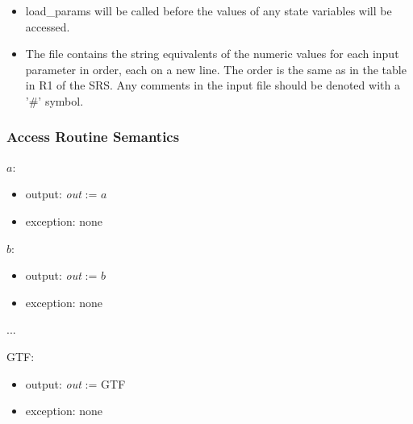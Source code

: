 \documentclass[12pt, titlepage]{article}
\begin{document}
\begin{itemize}

\item load\_params will be called before the values of any state variables will be accessed.

\item The file contains the string equivalents of the numeric values for
each input parameter in order, each on a new line. The order is the same as in
the table in R1 of the SRS. Any comments in the input file should be denoted
with a '\#' symbol.

\end{itemize}

\subsubsection{Access Routine Semantics}

\noindent $a$:
\begin{itemize}
\item output: \textit{out} := $a$
\item exception: none
\end{itemize}

\noindent $b$:
\begin{itemize}
\item output: \textit{out} := $b$
\item exception: none
\end{itemize}

...
~\newline

\noindent GTF:
\begin{itemize}
\item output: \textit{out} := GTF
\item exception: none
\end{itemize}
\end{document}

